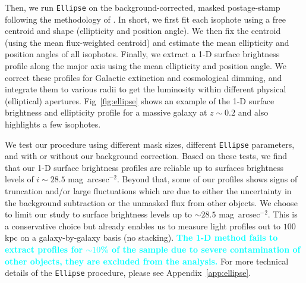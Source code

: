 \documentclass[a4paper,fleqn,usenatbib]{mnras}
\def\sb{mag~arcsec$^{-2}$}
\newcommand{\song}[1]{\textcolor{cyan}{\textbf{#1}}}
\begin{document}
    Then, we run \texttt{Ellipse} on the background-corrected, masked postage-stamp 
    following the methodology of \citet{Li2012}. 
    In short, we first fit each isophote using a free centroid and shape 
    (ellipticity and position angle). 
    We then fix the centroid (using the mean flux-weighted centroid) and estimate
    the mean ellipticity and position angles of all isophotes. 
    Finally, we extract a 1-D surface brightness profile along the major axis using 
    the mean ellipticity and position angle. 
    We correct these profiles for Galactic extinction and cosmological dimming, 
    and integrate them to various radii to get the luminosity 
    within different physical (elliptical) apertures. 
    Fig~\ref{fig:ellipse} shows an example of the 1-D surface brightness and 
    ellipticity profile for a massive galaxy at $z{\sim}0.2$ and also highlights 
    a few isophotes.    

    We test our procedure using different mask sizes, different \texttt{Ellipse} 
    parameters, and with or without our background correction. 
    Based on these tests, we find that our 1-D surface brightness profiles are reliable 
    up to surfaces brightness levels of $i{\sim}28.5$ \sb. 
    Beyond that, some of our profiles shows signs of truncation and/or large 
    fluctuations which are due to either the uncertainty in the background 
    subtraction or the unmasked flux from other objects.
    We choose to limit our study to surface brightness levels up to ${\sim} 28.5$ \sb. 
    This is a conservative choice but already enables us to measure light profiles 
    out to $100$ kpc on a galaxy-by-galaxy basis (no stacking). 
    \song{
    The 1-D method fails to extract profiles for ${\sim}10$\% of the sample due 
    to severe contamination of other objects, they are excluded from the analysis.
    }
    For more technical details of the \texttt{Ellipse} procedure, please see 
    Appendix~\ref{app:ellipse}.
    
\end{document}
